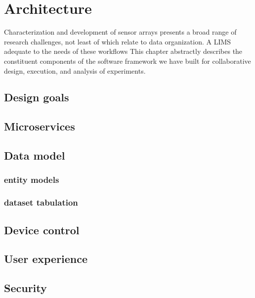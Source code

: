 \chapter{Architecture}

Characterization and development of sensor arrays presents a broad
range of research challenges, not least of which relate to data
organization. A LIMS adequate to the needs of these workflows
This chapter abstractly describes the constituent components
of the software framework we have built for collaborative design,
execution, and analysis of experiments.

\section{Design goals}




\section{Microservices}



\section{Data model}

\subsection{entity models}
\subsection{dataset tabulation}



\section{Device control}



\section{User experience}



\section{Security}